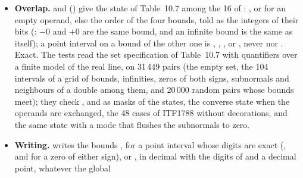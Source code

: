 \begin{itemize}
  and ,  (, ,
  , , as Tables~10.3 and 10.4), the certainly
  relations , ,
   and  (,
  , true when an interval is empty),
   and  (,
  , a common interval being nonempty and bounded,
  the NaN bounds of the empty set being no infinities\newinvfive) and
   and  (,
  , as Table~10.3,  counting an infinite
  bound as below itself, with the empty cases of Table~10.4\newinvfive) are
  decided on the bounds: exact (Chapter~\ref{chap:relations}). The tests
  find them exact, and  and  as Tables~10.3
  and 10.4 over 20\,000 pairs.
\item[$\bullet$] \textbf{Overlap.}  and
   () give the state of
  Table~10.7 among the 16 of :
  ,  or  for an
  empty operand, else the order of the four bounds, told as the integers of
  their bits (: $-0$ and $+0$ are the same
  bound, and an infinite bound is the same as itself); a point interval on
  a bound of the other one is , ,
  ,  or , never
   nor .\newinvfive{} Exact. The tests read
  the set specification of Table~10.7 with quantifiers over a finite model
  of the real line, on 31\,449 pairs (the empty set, the 104 intervals of
  a grid of bounds, infinities, zeros of both signs, subnormals and
  neighbours of a double among them, and 20\,000 random pairs whose bounds
  meet); they check ,  and  as
  masks of the states, the converse state when the operands are exchanged,
  the 48 cases of ITF1788 without decorations, and the same state with a
  mode that flushes the subnormals to zero.
\item[$\bullet$] \textbf{Writing.} 
  writes the bounds \code{[l, r]}, \code{[a]} for a point interval whose
  digits are exact (\code{[4]}, and \code{[0]} for a zero of either sign),
  or \code{[empty]}, in decimal with the digits of
   and a decimal point, whatever the global

\end{itemize}
